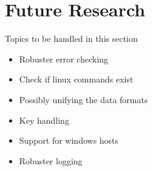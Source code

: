 \section{Future Research}

Topics to be handled in this section

\begin{itemize}
\item {Robuster  error checking}
\item {Check if linux commands exist}
\item {Possibly unifying the data formats}
\item {Key handling}
\item {Support for windows hosts}
\item {Robuster logging}
\end{itemize}